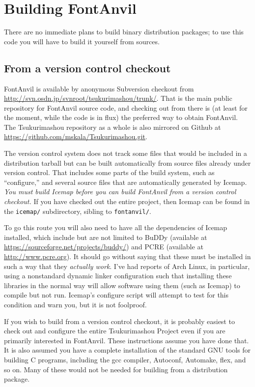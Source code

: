 
\chapter{Building FontAnvil}

There are no immediate plans to build binary distribution packages; to use
this code you will have to build it yourself from sources.

\section{From a version control checkout}

FontAnvil is available by anonymous Subversion checkout from
\url{http://svn.osdn.jp/svnroot/tsukurimashou/trunk/}. 
That is the main public repository for FontAnvil source code, and checking
out from there is (at least for the moment, while the code is in flux) the
preferred way to obtain FontAnvil.  The Tsukurimashou repository as a whole
is also mirrored on Github at
\url{https://github.com/mskala/Tsukurimashou.git}.

The version control system does not track some files that would be included
in a distribution tarball but can be built automatically from source files
already under version control.  That includes some parts of the build
system, such as ``configure,'' and several source files that are
automatically generated by Icemap.  \emph{You must build Icemap
before you can build FontAnvil from a version control checkout.} If you have
checked out the entire project, then Icemap can be found in
the \texttt{icemap/} subdirectory, sibling to \texttt{fontanvil/}.

To go this route you will also need to have all the dependencies of Icemap
installed, which include but are not limited to BuDDy (available at
\url{https://sourceforge.net/projects/buddy/}) and PCRE (available at
\url{http://www.pcre.org}).  It should go without saying that these must be
installed in such a way that they \emph{actually work}.  I've had reports of
Arch Linux, in particular, using a nonstandard dynamic linker configuration
such that installing these libraries in the normal way will allow software
using them (such as Icemap) to compile but not run.  Icemap's configure
script will attempt to test for this condition and warn you, but it is not
foolproof.

If you wish to build from a version control checkout, it is probably easiest
to check out and configure the entire Tsukurimashou Project even if you are
primarily interested in FontAnvil.  These instructions assume you have done
that.  It is also assumed you have a complete installation of the standard
GNU tools for building C programs, including the gcc compiler, Autoconf,
Automake, flex, and so on.  Many of these would not be needed for building
from a distribution package.

